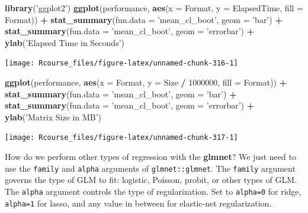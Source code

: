 \documentclass[]{book}
\newenvironment{Shaded}{\begin{snugshade}}{\end{snugshade}}
\newcommand{\DataTypeTok}[1]{\textcolor[rgb]{0.13,0.29,0.53}{#1}}
\newcommand{\DecValTok}[1]{\textcolor[rgb]{0.00,0.00,0.81}{#1}}
\newcommand{\KeywordTok}[1]{\textcolor[rgb]{0.13,0.29,0.53}{\textbf{#1}}}
\newcommand{\NormalTok}[1]{#1}
\newcommand{\OperatorTok}[1]{\textcolor[rgb]{0.81,0.36,0.00}{\textbf{#1}}}
\newcommand{\StringTok}[1]{\textcolor[rgb]{0.31,0.60,0.02}{#1}}
\theoremstyle{definition}
\theoremstyle{definition}
\theoremstyle{definition}
\theoremstyle{remark}
\begin{document}
\begin{Shaded}
\begin{Highlighting}[]
\KeywordTok{library}\NormalTok{(}\StringTok{'ggplot2'}\NormalTok{)}
\KeywordTok{ggplot}\NormalTok{(performance, }\KeywordTok{aes}\NormalTok{(}\DataTypeTok{x =}\NormalTok{ Format, }\DataTypeTok{y =}\NormalTok{ ElapsedTime, }\DataTypeTok{fill =}\NormalTok{ Format)) }\OperatorTok{+}
\StringTok{  }\KeywordTok{stat_summary}\NormalTok{(}\DataTypeTok{fun.data =} \StringTok{'mean_cl_boot'}\NormalTok{, }\DataTypeTok{geom =} \StringTok{'bar'}\NormalTok{) }\OperatorTok{+}
\StringTok{  }\KeywordTok{stat_summary}\NormalTok{(}\DataTypeTok{fun.data =} \StringTok{'mean_cl_boot'}\NormalTok{, }\DataTypeTok{geom =} \StringTok{'errorbar'}\NormalTok{) }\OperatorTok{+}
\StringTok{  }\KeywordTok{ylab}\NormalTok{(}\StringTok{'Elapsed Time in Seconds'}\NormalTok{) }
\end{Highlighting}
\end{Shaded}

\texttt{[image: Rcourse\_files/figure-latex/unnamed-chunk-316-1]}

\begin{Shaded}
\begin{Highlighting}[]
\KeywordTok{ggplot}\NormalTok{(performance, }\KeywordTok{aes}\NormalTok{(}\DataTypeTok{x =}\NormalTok{ Format, }\DataTypeTok{y =}\NormalTok{ Size }\OperatorTok{/}\StringTok{ }\DecValTok{1000000}\NormalTok{, }\DataTypeTok{fill =}\NormalTok{ Format)) }\OperatorTok{+}
\StringTok{  }\KeywordTok{stat_summary}\NormalTok{(}\DataTypeTok{fun.data =} \StringTok{'mean_cl_boot'}\NormalTok{, }\DataTypeTok{geom =} \StringTok{'bar'}\NormalTok{) }\OperatorTok{+}
\StringTok{  }\KeywordTok{stat_summary}\NormalTok{(}\DataTypeTok{fun.data =} \StringTok{'mean_cl_boot'}\NormalTok{, }\DataTypeTok{geom =} \StringTok{'errorbar'}\NormalTok{) }\OperatorTok{+}
\StringTok{  }\KeywordTok{ylab}\NormalTok{(}\StringTok{'Matrix Size in MB'}\NormalTok{) }
\end{Highlighting}
\end{Shaded}

\texttt{[image: Rcourse\_files/figure-latex/unnamed-chunk-317-1]}

How do we perform other types of regression with the \textbf{glmnet}?
We just need to use the \texttt{family} and \texttt{alpha} arguments of \texttt{glmnet::glmnet}.
The \texttt{family} argument governs the type of GLM to fit: logistic, Poisson, probit, or other types of GLM.
The \texttt{alpha} argument controls the type of regularization. Set to \texttt{alpha=0} for ridge, \texttt{alpha=1} for lasso, and any value in between for elastic-net regularization.
\end{document}
